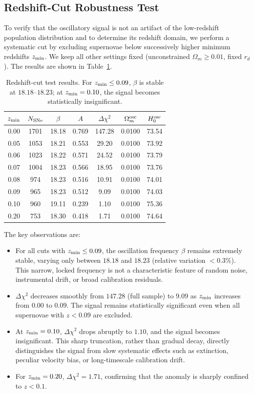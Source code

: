 \documentclass[10pt,a4paper,twocolumn]{article}
\begin{document}
\subsection{Redshift-Cut Robustness Test}
To verify that the oscillatory signal is not an artifact of the low-redshift population distribution and to determine its redshift domain, we perform a systematic cut by excluding supernovae below successively higher minimum redshifts $z_{\rm min}$. We keep all other settings fixed (unconstrained $\Omega_m\ge0.01$, fixed $r_d$). The results are shown in Table~\ref{tab:cut}.

\begin{table}[ht]
\centering
\setlength{\tabcolsep}{3.0pt}
\caption{\label{tab:cut}Redshift-cut test results. For $z_{\rm min}\le0.09$, $\beta$ is stable at $18.18$–$18.23$; at $z_{\rm min}=0.10$, the signal becomes statistically insignificant.}
\begin{tabular}{ccccccc}
\toprule
$z_{\rm min}$ & $N_{\rm SNe}$ & $\beta$ & $A$ & $\Delta\chi^2$ & $\Omega_m^{\rm osc}$ & $H_0^{\rm osc}$ \\
\midrule
0.00 & 1701 & 18.18 & 0.769 & 147.28 & 0.0100 & 73.54 \\
0.05 & 1053 & 18.21 & 0.553 & 29.20 & 0.0100 & 73.92 \\
0.06 & 1023 & 18.22 & 0.571 & 24.52 & 0.0100 & 73.79 \\
0.07 & 1004 & 18.23 & 0.566 & 18.95 & 0.0100 & 73.76 \\
0.08 & 974  & 18.23 & 0.516 & 10.91 & 0.0100 & 74.01 \\
0.09 & 965  & 18.23 & 0.512 &  9.09 & 0.0100 & 74.03 \\
0.10 & 960  & 19.11 & 0.239 &  1.10 & 0.0100 & 75.36 \\
0.20 & 753  & 18.30 & 0.418 &  1.71 & 0.0100 & 74.64 \\
\bottomrule
\end{tabular}
\end{table}

The key observations are:
\begin{itemize}
    \item For all cuts with $z_{\rm min}\le0.09$, the oscillation frequency $\beta$ remains extremely stable, varying only between $18.18$ and $18.23$ (relative variation $<0.3\%$). This narrow, locked frequency is not a characteristic feature of random noise, instrumental drift, or broad calibration residuals.
    \item $\Delta\chi^2$ decreases smoothly from $147.28$ (full sample) to $9.09$ as $z_{\rm min}$ increases from $0.00$ to $0.09$. The signal remains statistically significant even when all supernovae with $z<0.09$ are excluded.
    \item At $z_{\rm min}=0.10$, $\Delta\chi^2$ drops abruptly to $1.10$, and the signal becomes insignificant. This sharp truncation, rather than gradual decay, directly distinguishes the signal from slow systematic effects such as extinction, peculiar velocity bias, or long-timescale calibration drift.
    \item For $z_{\rm min}=0.20$, $\Delta\chi^2=1.71$, confirming that the anomaly is sharply confined to $z<0.1$.
\end{itemize}
\end{document}
